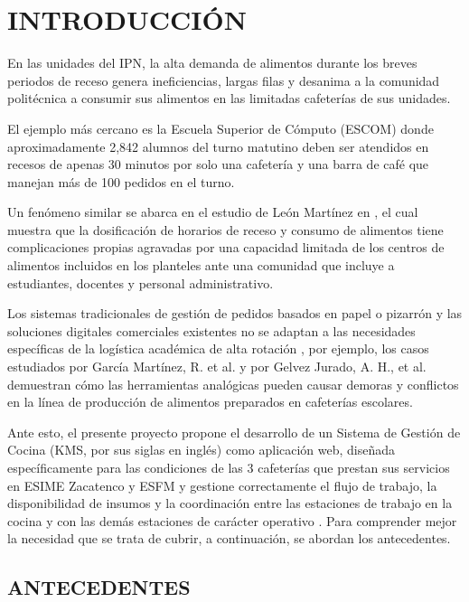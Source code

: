 
\chapter{INTRODUCCIÓN}

En las unidades del IPN, la alta demanda de alimentos durante los breves periodos de receso genera ineficiencias, largas filas y desanima a la comunidad politécnica a consumir sus alimentos en las limitadas cafeterías de sus unidades.

El ejemplo más cercano es la Escuela Superior de Cómputo (ESCOM) \cite{ipn2025estadistica} donde aproximadamente 2,842 alumnos del turno matutino deben ser atendidos en recesos de apenas 30 minutos por solo una cafetería y una barra de café que manejan más de 100 pedidos en el turno.

Un fenómeno similar se abarca en el estudio de León Martínez en \cite{leon2023planificacion}, el cual muestra que la dosificación de horarios de receso y consumo de alimentos tiene complicaciones propias agravadas por una capacidad limitada de los centros de alimentos incluidos en los planteles ante una comunidad que incluye a estudiantes, docentes y personal administrativo.

Los sistemas tradicionales de gestión de pedidos basados en papel o pizarrón y las soluciones digitales comerciales existentes no se adaptan a las necesidades específicas de la logística académica de alta rotación \cite{lavu2025kds}, por ejemplo, los casos estudiados por García Martínez, R. et al. \cite{garcia2024estrategia} y por Gelvez Jurado, A. H., et al. \cite{gelvez2024estudio} demuestran cómo las herramientas analógicas pueden causar demoras y conflictos en la línea de producción de alimentos preparados en cafeterías escolares.

Ante esto, el presente proyecto propone el desarrollo de un Sistema de Gestión de Cocina (KMS, por sus siglas en inglés) como aplicación web, diseñada específicamente para las condiciones de las 3 cafeterías que prestan sus servicios en ESIME Zacatenco y ESFM y gestione correctamente el flujo de trabajo, la disponibilidad de insumos y la coordinación entre las estaciones de trabajo en la cocina y con las demás estaciones de carácter operativo \cite{zaenal2024commercial}. Para comprender mejor la necesidad que se trata de cubrir, a continuación, se abordan los antecedentes.

\section{ANTECEDENTES}

